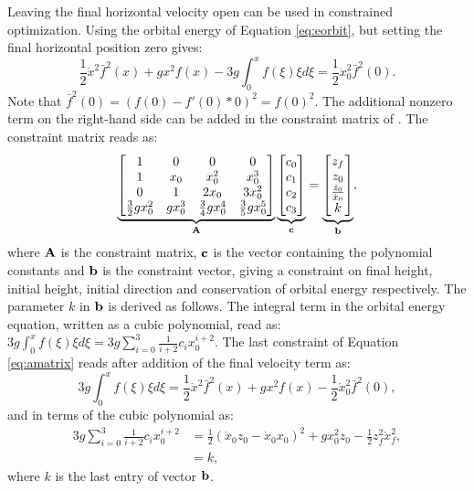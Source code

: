 Leaving the final horizontal velocity open can be used in constrained optimization. Using the orbital energy of Equation \ref{eq:eorbit}, but setting the final horizontal position zero gives:
\begin{equation}
    \frac{1}{2}\dot{x}^2\bar{f}^2(x)+gx^2f(x) - 3g\int_{0}^xf(\xi)\xi d\xi = \frac{1}{2}\dot{x}_0^2\bar{f}^2(0).
\end{equation}
Note that $\bar{f}^2(0)=(f(0)-f'(0)*0)^2=f(0)^2$. The additional nonzero term on the right-hand side can be added in the constraint matrix of \cite{koolen2016balance}. The constraint matrix reads as:
\begin{equation}
    \underbrace{\begin{bmatrix}1 & 0 & 0 & 0 \\ 
     1 & x_0 & x_0^2 & x_0^3\\
     0 & 1 & 2x_0 & 3x_0^2\\
     \frac{3}{2}gx_0^2 & gx_0^3 & \frac{3}{4}gx_0^4 & \frac{3}{5}gx_0^5\\
     \end{bmatrix}}_{\mathbf{A}}
     \underbrace{\begin{bmatrix}
     c_0\\
     c_1\\
     c_2\\
     c_3\\
     \end{bmatrix}}_{\mathbf{c}}=
     \underbrace{\begin{bmatrix}
     z_f\\
     z_0\\
     \frac{\dot{z}_0}{\dot{x}_0}\\
     k\\
     \end{bmatrix}}_{\mathbf{b}},
     \label{eq:amatrix}
\end{equation}
where $\mathbf{A}$ is the constraint matrix, $\mathbf{c}$ is the vector containing the polynomial constants and $\mathbf{b}$ is the constraint vector, giving a constraint on final height, initial height, initial direction and conservation of orbital energy respectively.
The parameter $k$ in $\mathbf{b}$ is derived as follows. The integral term in the orbital energy equation, written as a cubic polynomial, read as: $3g\int_{0}^xf(\xi)\xi d\xi = 3g\sum_{i=0}^3\frac{1}{i+2}c_ix_0^{i+2}$. The last constraint of Equation \ref{eq:amatrix} reads after addition of the final velocity term as:
\begin{equation}
		3g\int_{0}^xf(\xi)\xi d\xi =\frac{1}{2}\dot{x}^2\bar{f}^2(x)+gx^2f(x) - \frac{1}{2}\dot{x}_0^2\bar{f}^2(0),
\end{equation}
and in terms of the cubic polynomial as:
\begin{align}
	3g\sum_{i=0}^3\frac{1}{i+2}c_ix_0^{i+2}& = \frac{1}{2}(\dot{x}_0z_0-\dot{x}_0x_0)^2 + gx_0^2z_0 - \frac{1}{2}z_f^2\dot{x}_f^2,\\
	&=k,
\end{align}
where $k$ is the last entry of vector $\mathbf{b}$. 

